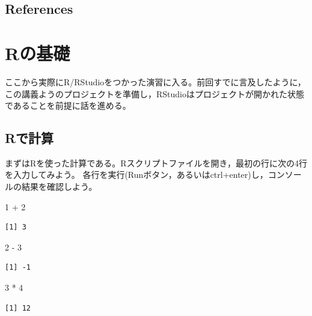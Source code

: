 \documentclass[
  a4paper,
]{ltjsbook}
\newenvironment{Shaded}{\begin{snugshade}}{\end{snugshade}}
\newcommand{\DecValTok}[1]{\textcolor[rgb]{0.68,0.00,0.00}{#1}}
\newcommand{\SpecialCharTok}[1]{\textcolor[rgb]{0.37,0.37,0.37}{#1}}
\begin{document}
\section{References}\label{references}

\printbibliography[heading=none]


\chapter{Rの基礎}\label{rux306eux57faux790e}

ここから実際にR/RStudioをつかった演習に入る。前回すでに言及したように，この講義ようのプロジェクトを準備し，RStudioはプロジェクトが開かれた状態であることを前提に話を進める。

\section{Rで計算}\label{rux3067ux8a08ux7b97}

まずはRを使った計算である。Rスクリプトファイルを開き，最初の行に次の4行を入力してみよう。
各行を実行(Runボタン，あるいはctrl+enter)し，コンソールの結果を確認しよう。

\begin{Shaded}
\begin{Highlighting}[]
\DecValTok{1} \SpecialCharTok{+} \DecValTok{2}
\end{Highlighting}
\end{Shaded}

\begin{verbatim}
[1] 3
\end{verbatim}

\begin{Shaded}
\begin{Highlighting}[]
\DecValTok{2} \SpecialCharTok{{-}} \DecValTok{3}
\end{Highlighting}
\end{Shaded}

\begin{verbatim}
[1] -1
\end{verbatim}

\begin{Shaded}
\begin{Highlighting}[]
\DecValTok{3} \SpecialCharTok{*} \DecValTok{4}
\end{Highlighting}
\end{Shaded}

\begin{verbatim}
[1] 12
\end{verbatim}
\end{document}
